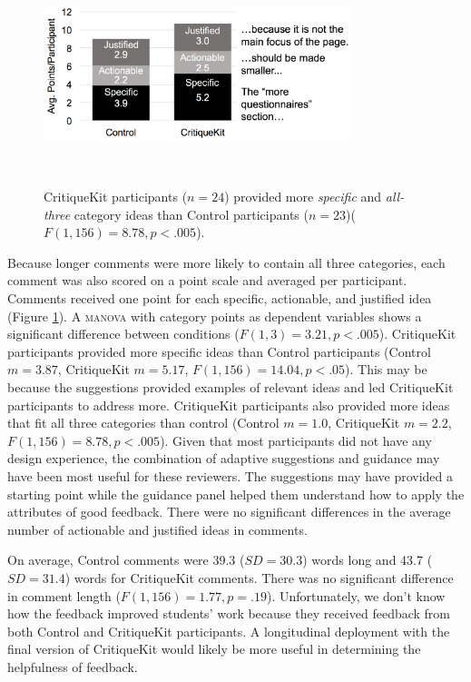 \begin{figure}[b!]
\centering
  \includegraphics[width=0.8\textwidth]{critiquekit/figures/exp2_bar.png}
  \caption{CritiqueKit participants ($n=24$) provided more \textit{specific} and \textit{all-three} category ideas than Control participants ($n=23$)($F(1,156) = 8.78, p < .005$).}~\label{fig:critiquekit_exp2_bar}
\end{figure}

Because longer comments were more likely to contain all three categories, each comment was also scored on a point scale and averaged per participant. Comments received one point for each specific, actionable, and justified idea (Figure \ref{fig:critiquekit_exp2_bar}). A \textsc{manova} with category points as dependent variables shows a significant difference between conditions ($F(1,3) = 3.21, p < .005$). CritiqueKit participants provided more specific ideas than Control participants (Control $m = 3.87$, CritiqueKit $m = 5.17$, $F(1,156) = 14.04, p  <  .05$). This may be because the suggestions provided examples of relevant ideas and led CritiqueKit participants to address more. CritiqueKit participants also provided more ideas that fit all three categories than control (Control $m = 1.0$, CritiqueKit $m = 2.2$, $F(1,156) = 8.78, p < .005$). Given that most participants did not have any design experience, the combination of adaptive suggestions and guidance may have been most useful for these reviewers. The suggestions may have provided a starting point while the guidance panel helped them understand how to apply the attributes of good feedback. There were no significant differences in the average number of actionable and justified ideas in comments.

On average, Control comments were 39.3 ($SD = 30.3$) words long and 43.7 ($SD = 31.4$) words for CritiqueKit comments. There was no significant difference in comment length ($F(1,156) = 1.77, p = .19$). Unfortunately, we don't know how the feedback improved students' work because they received feedback from both Control and CritiqueKit participants. A longitudinal deployment with the final version of CritiqueKit would likely be more useful in determining the helpfulness of feedback.


